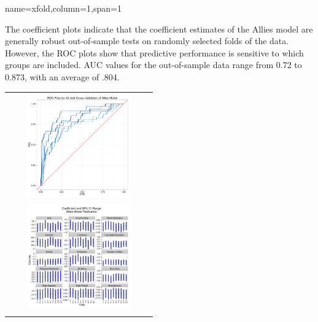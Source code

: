 \documentclass[landscape,paperheight=24in,fontscale=.45,paperwidth=36in,landscape,final]{baposter}
\begin{document}
\begin{poster}
{name=xfold,column=1,span=1}
{
The coefficient plots indicate that the coefficient estimates of the
Allies model are generally robust out-of-sample tests on randomly
selected folds of the data. However, the ROC
plots show that predictive performance is sensitive
to which groups are included. AUC values for the out-of-sample data range from 0.72 to 0.873, with an
average of .804.

\vspace{-1mm}
\begin{center}
\begin{tabular}{c}
\includegraphics[height=45mm,width=60mm]{XfoldRocplot.pdf}\\
 \includegraphics[height=45mm,width=60mm]{XVal_Poster_coefPlots.pdf}\\
\vspace{-10mm}
\end{tabular}
\end{center}
\vspace{3mm}

}



\end{poster}
\end{document}
